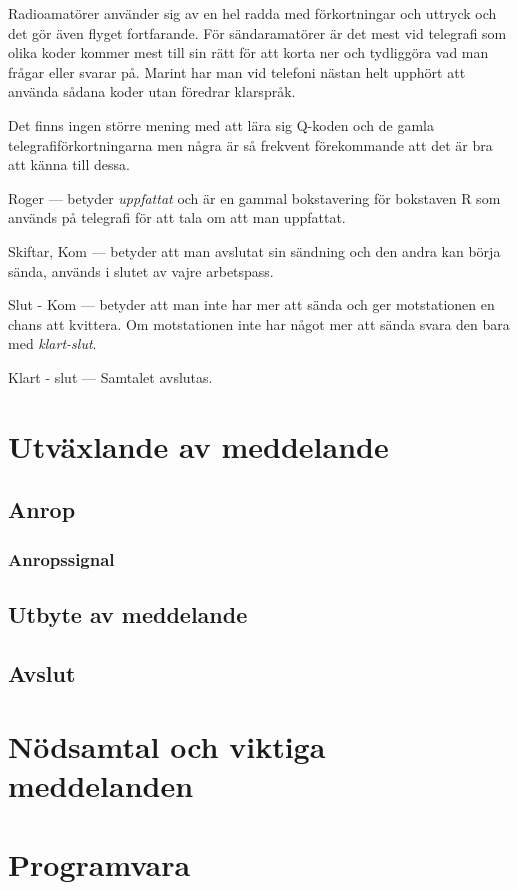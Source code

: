 Radioamatörer använder sig av en hel radda med förkortningar och uttryck och det gör även flyget fortfarande. För sändaramatörer är det mest vid telegrafi som olika koder kommer mest till sin rätt för att korta ner och tydliggöra vad man frågar eller svarar på. Marint har man vid telefoni nästan helt upphört att använda sådana koder utan föredrar klarspråk. 

Det finns ingen större mening med att lära sig Q-koden och de gamla telegrafiförkortningarna men några är så frekvent förekommande att det är bra att känna till dessa.

Roger --- betyder \textit{uppfattat} och är en gammal bokstavering för bokstaven R som används på telegrafi för att tala om att man uppfattat.

Skiftar, Kom --- betyder att man avslutat sin sändning och den andra kan börja sända, används i slutet av vajre arbetspass.

Slut - Kom --- betyder att man inte har mer att sända och ger motstationen en chans att kvittera. Om motstationen inte har något mer att sända svara den bara med \textit{klart-slut}.

Klart - slut --- Samtalet avslutas.


\section{Utväxlande av meddelande}

\subsection{Anrop}

\subsubsection{Anropssignal}

\subsection{Utbyte av meddelande}

\subsection{Avslut}

\section{Nödsamtal och viktiga meddelanden}

\section{Programvara}
